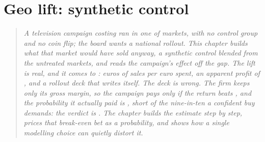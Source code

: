 %
\chapter{Geo lift: synthetic control}
\label{ch:geo}

\newcommand{\refiv}{\ifcsname r@ch:iv\endcsname\cref{ch:iv}\else the instrumental-variables chapter\fi}
\newcommand{\refdid}{\ifcsname r@ch:did\endcsname\cref{ch:did}\else the difference-in-differences chapter\fi}
\newcommand{\reffound}{\ifcsname r@ch:foundations\endcsname\cref{ch:foundations}\else the foundations chapter\fi}

\begin{quote}\small
\emph{A television campaign costing \keur{\nbSevenCost} ran in one of \nbSevenNDmas{} markets, with
no control group and no coin flip; the board wants a national rollout. This chapter builds what that
market would have sold anyway, a \emph{synthetic control} blended from the untreated markets, and
reads the campaign's effect off the gap. The lift is real, and it comes to \keur{\nbSevenClTotal}:
\nbSevenIroas{} euros of sales per euro spent, an apparent profit of \keur{\nbSevenApparentProfit},
and a rollout deck that writes itself. The deck is wrong. The firm keeps only its \pc{\nbSevenMargin}
gross margin, so the campaign pays only if the return beats \nbSevenBreakevenIroas{}, and the
probability it actually paid is \nbSevenPGo{}, short of the nine-in-ten a confident buy demands: the
verdict is \textbf{\nbSevenDecision}.
The chapter builds the estimate step by step, prices that break-even bet as a probability, and shows
how a single modelling choice can quietly distort it.}
\end{quote}

